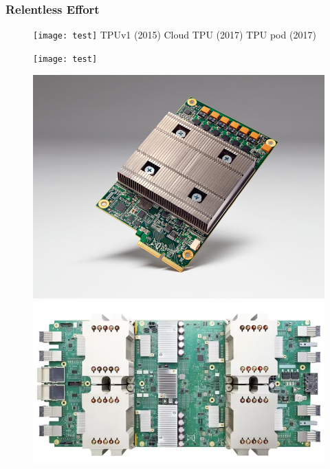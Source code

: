 \documentclass[c]{beamer}
\begin{document}
	\begin{frame} [c]
		\frametitle{Relentless Effort}
		\begin{figure}[t]
  {\begin{minipage}{58.3pt}
    \texttt{[image: test]}
    TPUv1\newline
{\small  (2015)}
\newline
\newline
\newline
\newline
\newline
Cloud TPU\newline
{\small  (2017)}
\newline
\newline
\newline
\newline
TPU pod\newline
{\small  (2017)}
  \end{minipage}}
  \hfill
  {\begin{minipage}{145pt}
    \texttt{[image: test]}
     \begin{center}
		 \includegraphics[scale=.16]{images/4tpu.png}
           \label{fig: TPUv1}
          \includegraphics[scale=.2]{images/5cloudtpu.png}

\end{center}
\end{minipage}}
\end{figure}
\end{frame}
\end{document}
